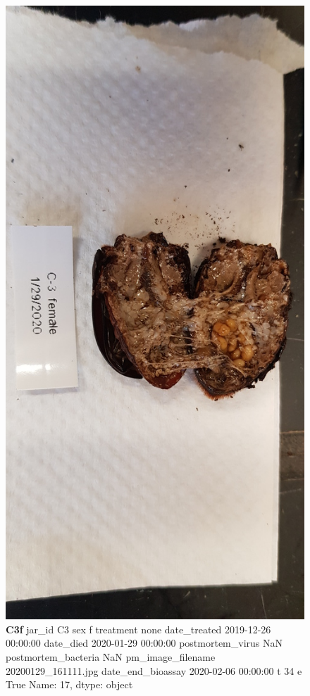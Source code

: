 \begin{figure}[h!]
\centering
\includegraphics[width=\textwidth]{pm-images/20200129_161111.jpg}
\caption{\textbf{C3f} jar\_id                                  C3
sex                                      f
treatment                             none
date\_treated           2019-12-26 00:00:00
date\_died              2020-01-29 00:00:00
postmortem\_virus                       NaN
postmortem\_bacteria                    NaN
pm\_image\_filename      20200129\_161111.jpg
date\_end\_bioassay      2020-02-06 00:00:00
t                                       34
e                                     True
Name: 17, dtype: object}
\end{figure}
\clearpage

